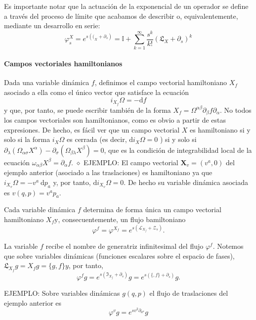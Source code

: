 Es importante notar que la actuación de la exponencial de un operador se define a través del proceso de límite que acabamos de describir o, equivalentemente, mediante un desarrollo en serie:
$$
\varphi_{s}^{X}=e^{s\left(\mathfrak{(}_{X}+\partial_{s}\right)}=\mathbb{I}+\sum_{k=1}^{\infty} \frac{s^{k}}{k!}\left(\mathfrak{L}_{X}+\partial_{s}\right)^{k}
$$

\paragraph{Campos vectoriales hamiltonianos}

Dada una variable dinámica $f$, definimos el campo vectorial hamiltoniano $X_{f}$ asociado a ella como el único vector que satisface la ecuación
$$
i_{X_{f}} \Omega=-\mathrm{d} f
$$
y que, por tanto, se puede escribir también de la forma $X_{f}=\Omega^{\alpha \beta} \partial_{\beta} f \partial_{\alpha}$.
No todos los campos vectoriales son hamiltonianos, como es obvio a partir de estas expresiones. De hecho, es fácil ver que un campo vectorial $X$ es hamiltoniano si y solo si la forma $i_{X} \Omega$ es cerrada (es decir, $\mathrm{d} i_{X} \Omega=0$ ) si y solo si $\partial_{\lambda}\left(\Omega_{\alpha \sigma} X^{\alpha}\right)-\partial_{\sigma}\left(\Omega_{\beta \lambda} X^{\beta}\right)=0$, que es la condición de integrabilidad local de la ecuación $\omega_{\alpha \beta} X^{\beta}=\partial_{\alpha} f$.
$\diamond$ EJEMPLO: El campo vectorial $\boldsymbol{X}_{v}=\left(v^{a}, 0\right)$ del ejemplo anterior (asociado a las traslaciones) es hamiltoniano ya que $i_{X_{v}} \Omega=-v^{a} \mathrm{~d} p_{a}$ y, por tanto, $\mathrm{d} i_{X_{v}} \Omega=0$. De hecho su variable dinámica asociada es $v(q, p)=v^{a} p_{a}$.

Cada variable dinámica $f$ determina de forma única un campo vectorial hamiltoniano $X_{f} \mathrm{y}$, consecuentemente, un flujo bamiltoniano
$$
\varphi^{f}=\varphi^{X_{f}}=e^{s\left(\mathcal{L}_{X_{f}}+\mathcal{Z}_{s}\right)} .
$$

La variable $f$ recibe el nombre de generatriz infinitesimal del flujo $\varphi^{f}$.
Notemos que sobre variables dinámicas (funciones escalares sobre el espacio de fases), $\mathfrak{L}_{X_{f}} g=X_{f} g=\{g, f\} y$, por tanto,
$$
\varphi^{f} g=e^{s\left(\mathfrak{I}_{X_{f}}+\partial_{s}\right)} g=e^{s\left(\{, f\}+\partial_{s}\right)} g .
$$

EJEMPLO: Sobre variables dinámicas $g(q, p)$ el flujo de traslaciones del ejemplo anterior es
$$
\varphi^{v} g=e^{s v^{2} \partial_{a^{a}}} g
$$

